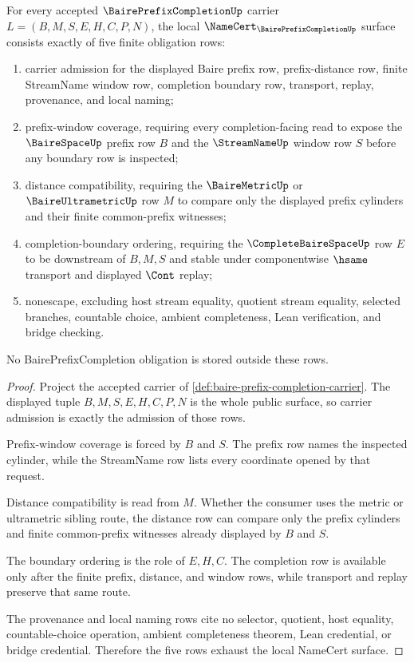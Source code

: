\begin{theorem}\label{thm:baire-prefix-completion-namecert-obligations}
For every accepted $\BairePrefixCompletionUp$ carrier $L=(B,M,S,E,H,C,P,N)$, the local $\NameCert_{\BairePrefixCompletionUp}$ surface consists exactly of five finite obligation rows:
\begin{enumerate}
\item carrier admission for the displayed Baire prefix row, prefix-distance row, finite StreamName window row, completion boundary row, transport, replay, provenance, and local naming;
\item prefix-window coverage, requiring every completion-facing read to expose the $\BaireSpaceUp$ prefix row $B$ and the $\StreamNameUp$ window row $S$ before any boundary row is inspected;
\item distance compatibility, requiring the $\BaireMetricUp$ or $\BaireUltrametricUp$ row $M$ to compare only the displayed prefix cylinders and their finite common-prefix witnesses;
\item completion-boundary ordering, requiring the $\CompleteBaireSpaceUp$ row $E$ to be downstream of $B,M,S$ and stable under componentwise $\hsame$ transport and displayed $\Cont$ replay;
\item nonescape, excluding host stream equality, quotient stream equality, selected branches, countable choice, ambient completeness, Lean verification, and bridge checking.
\end{enumerate}
No BairePrefixCompletion obligation is stored outside these rows.
\end{theorem}
\begin{proof}
Project the accepted carrier of \autoref{def:baire-prefix-completion-carrier}. The displayed tuple $B,M,S,E,H,C,P,N$ is the whole public surface, so carrier admission is exactly the admission of those rows.

Prefix-window coverage is forced by $B$ and $S$. The prefix row names the inspected cylinder, while the StreamName row lists every coordinate opened by that request.

Distance compatibility is read from $M$. Whether the consumer uses the metric or ultrametric sibling route, the distance row can compare only the prefix cylinders and finite common-prefix witnesses already displayed by $B$ and $S$.

The boundary ordering is the role of $E,H,C$. The completion row is available only after the finite prefix, distance, and window rows, while transport and replay preserve that same route.

The provenance and local naming rows cite no selector, quotient, host equality, countable-choice operation, ambient completeness theorem, Lean credential, or bridge credential. Therefore the five rows exhaust the local NameCert surface.
\end{proof}

